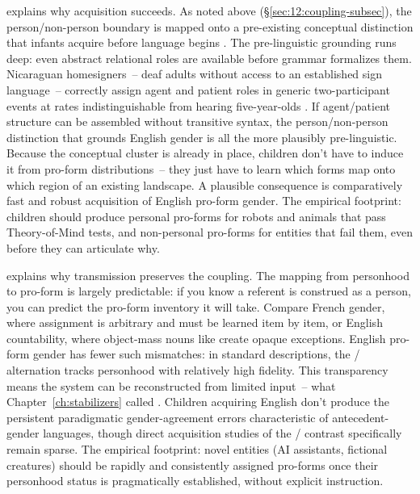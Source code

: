  explains why acquisition succeeds. As noted above (§\ref{sec:12:coupling-subsec}), the person/non-person boundary is mapped onto a pre-existing conceptual distinction that infants acquire before language begins \autocite{csibra2003,carey2009}. The pre-linguistic grounding runs deep: even abstract relational roles are available before grammar formalizes them. Nicaraguan homesigners~-- deaf adults without access to an established sign language~-- correctly assign agent and patient roles in generic two-participant events at rates indistinguishable from hearing five-year-olds \citep{canudas-grabolosa2026linguisticModel}. If agent/patient structure can be assembled without transitive syntax, the person/non-person distinction that grounds English gender is all the more plausibly pre-linguistic. Because the conceptual cluster is already in place, children don't have to induce it from pro-form distributions~-- they just have to learn which forms map onto which region of an existing landscape. A plausible consequence is comparatively fast and robust acquisition of English pro-form gender. The empirical footprint: children should produce personal pro-forms for robots and animals that pass Theory-of-Mind tests, and non-personal pro-forms for entities that fail them, even before they can articulate why.

 explains why transmission preserves the coupling. The mapping from personhood to pro-form is largely predictable: if you know a referent is construed as a person, you can predict the pro-form inventory it will take. Compare French gender, where assignment is arbitrary and must be learned item by item, or English countability, where object-mass nouns like  create opaque exceptions. English pro-form gender has fewer such mismatches: in standard descriptions, the / alternation tracks personhood with relatively high fidelity. This transparency means the system can be reconstructed from limited input~-- what Chapter~\ref{ch:stabilizers} called . Children acquiring English don't produce the persistent paradigmatic gender-agreement errors characteristic of antecedent-gender languages, though direct acquisition studies of the / contrast specifically remain sparse. The empirical footprint: novel entities (AI assistants, fictional creatures) should be rapidly and consistently assigned pro-forms once their personhood status is pragmatically established, without explicit instruction.

